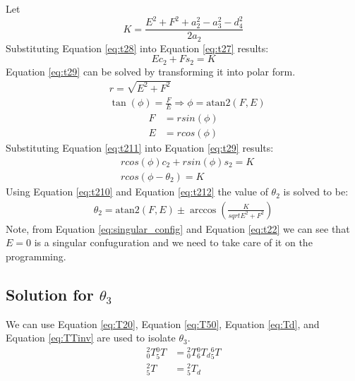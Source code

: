 Let
\begin{equation} \label{eq:t28}
    K=\frac{E^2+F^2+a_2^2-a_3^2-d_4^2}{2a_2}
\end{equation}
Substituting Equation \ref{eq:t28} into Equation \ref{eq:t27} results:
\begin{equation} \label{eq:t29}
    Ec_2+Fs_2=K
\end{equation}
Equation \ref{eq:t29} can be solved by transforming it into polar form.
\begin{equation} \label{eq:t210}
    \begin{aligned}
         & r=\sqrt{E^2+F^2}                                            \\
         & \tan(\phi)=\frac{F}{E} \Rightarrow \phi=\mathrm{atan2}(F,E)
    \end{aligned}
\end{equation}
\begin{equation} \label{eq:t211}
    \begin{aligned}
        F & =rsin(\phi) \\
        E & =rcos(\phi)
    \end{aligned}
\end{equation}
Substituting Equation \ref{eq:t211} into Equation \ref{eq:t29} results:
\begin{equation} \label{eq:t212}
    \begin{aligned}
         & rcos(\phi)c_2+rsin(\phi)s_2=K \\
         & rcos(\phi-\theta_2)=K
    \end{aligned}
\end{equation}
Using Equation \ref{eq:t210} and Equation \ref{eq:t212} the value of $\theta_2$ is solved to be:
\begin{equation}
    \begin{aligned}
        \theta_2=\mathrm{atan2}(F,E) \pm \arccos\left(\frac{K}{sqrt{E^2+F^2}}\right)
    \end{aligned}
\end{equation}
Note, from Equation \ref{eq:singular_config} and Equation \ref{eq:t22} we can see that $E=0$ is
a singular confuguration and we need to take care of it on the programming.
\subsection{Solution for $\theta_3$}
We can use Equation \ref{eq:T20}, Equation \ref{eq:T50}, Equation \ref{eq:Td}, and Equation \ref{eq:TTinv} are used to isolate $\theta_3$.
\begin{equation} \label{eq:t31}
    \begin{aligned}
        {_0^{2}}T{_5^{0}}T & ={_0^{2}}T{_6^{0}}T_d{_5^{6}}T \\
        {_5^{2}}T          & ={_5^{2}}T_d
    \end{aligned}
\end{equation}

